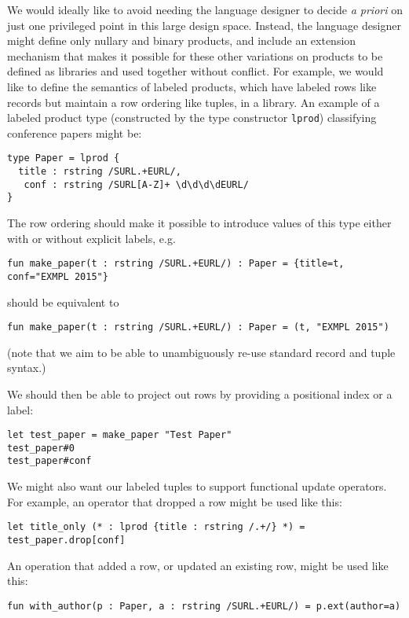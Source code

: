 We would ideally like to avoid needing the language designer to decide \emph{a priori} on just one privileged point in this large design space. Instead, the language designer might define only nullary and binary products, and include an extension mechanism that makes it possible for these other variations on products to be defined as libraries and  used together without conflict. For example, we would like to define the semantics of labeled products, which have labeled rows like records but maintain a row ordering like tuples, in a library. An example of a labeled product type (constructed by the type constructor \lstinline{lprod}) classifying conference papers might be:
\begin{lstlisting}[numbers=none]
type Paper = lprod {
  title : rstring /SURL.+EURL/,
   conf : rstring /SURL[A-Z]+ \d\d\d\dEURL/
}
\end{lstlisting}

The row ordering should make it possible to introduce values of this type either with or without explicit labels, e.g.
\begin{lstlisting}[numbers=none]
fun make_paper(t : rstring /SURL.+EURL/) : Paper = {title=t, conf="EXMPL 2015"}
\end{lstlisting}
should be equivalent to
\begin{lstlisting}[numbers=none]
fun make_paper(t : rstring /SURL.+EURL/) : Paper = (t, "EXMPL 2015")
\end{lstlisting}
(note that we aim to be able to unambiguously re-use standard record and tuple syntax.)

We should then be able to project out rows by providing a positional index or a label:
\begin{lstlisting}[numbers=none]
let test_paper = make_paper "Test Paper"
test_paper#0
test_paper#conf
\end{lstlisting}

We might also want our labeled tuples to support functional update operators. For example, an operator that dropped a row might be used like this:
\begin{lstlisting}[numbers=none]
let title_only (* : lprod {title : rstring /.+/} *) = test_paper.drop[conf]
\end{lstlisting}
An operation that added a row, or updated an existing row, might be used like this:
\begin{lstlisting}[numbers=none]
fun with_author(p : Paper, a : rstring /SURL.+EURL/) = p.ext(author=a)
\end{lstlisting}


